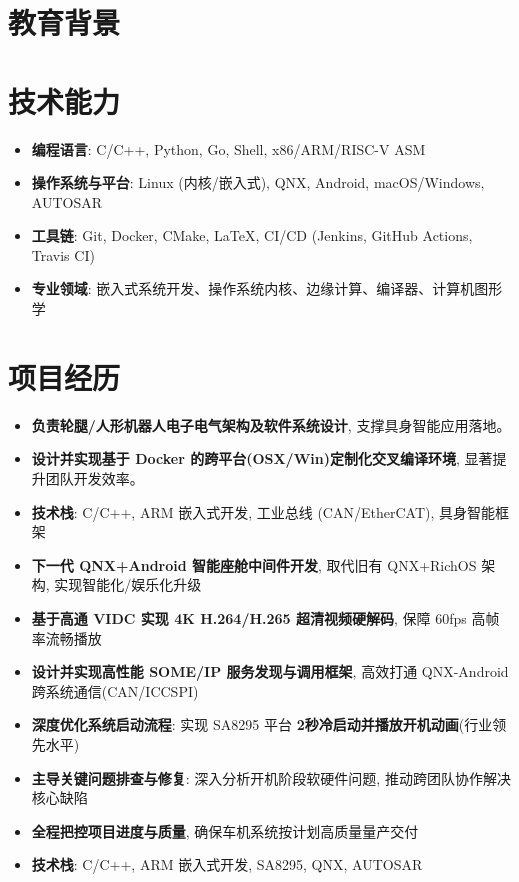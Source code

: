 \documentclass{resume}
\begin{document}
\lastupdated


\section{教育背景}

\section{技术能力}
\begin{itemize}[parsep=0.2ex]
  \item \textbf{编程语言}: C/C++, Python, Go, Shell, x86/ARM/RISC-V ASM
  \item \textbf{操作系统与平台}: Linux (内核/嵌入式), QNX, Android, macOS/Windows, AUTOSAR
  \item \textbf{工具链}: Git, Docker, CMake, \LaTeX, CI/CD (Jenkins, GitHub Actions, Travis CI)
  \item \textbf{专业领域}: 嵌入式系统开发、操作系统内核、边缘计算、编译器、计算机图形学
\end{itemize}

\section{项目经历}
\begin{itemize}
  \item \textbf{负责轮腿/人形机器人电子电气架构及软件系统设计}, 支撑具身智能应用落地。
  \item \textbf{设计并实现基于 Docker 的跨平台(OSX/Win)定制化交叉编译环境}, 显著提升团队开发效率。
  \item \textbf{技术栈}: C/C++, ARM 嵌入式开发, 工业总线 (CAN/EtherCAT), 具身智能框架
\end{itemize}

\begin{itemize}
  \item \textbf{下一代 QNX+Android 智能座舱中间件开发}, 取代旧有 QNX+RichOS 架构, 实现智能化/娱乐化升级
  \item \textbf{基于高通 VIDC 实现 4K H.264/H.265 超清视频硬解码}, 保障 60fps 高帧率流畅播放
  \item \textbf{设计并实现高性能 SOME/IP 服务发现与调用框架}, 高效打通 QNX-Android 跨系统通信(CAN/ICCSPI)
  \item \textbf{深度优化系统启动流程}: 实现 SA8295 平台 \textbf{2秒冷启动并播放开机动画}(行业领先水平)
  \item \textbf{主导关键问题排查与修复}: 深入分析开机阶段软硬件问题, 推动跨团队协作解决核心缺陷
  \item \textbf{全程把控项目进度与质量}, 确保车机系统按计划高质量量产交付
  \item \textbf{技术栈}: C/C++, ARM 嵌入式开发, SA8295, QNX, AUTOSAR
\end{itemize}
\end{document}
